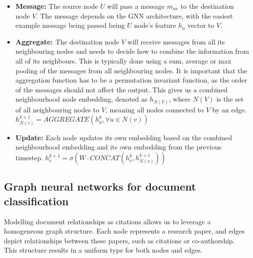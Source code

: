 \documentclass[10pt,oneside]{book}
\begin{document}
\begin{tcolorbox}[title=Message Passing Neural Networks in GNNs]
    \begin{itemize}
        \item {\bf{Message:}} The source node $U$ will pass a message $m_{uv}$ to the destination node $V$. The message depends on the GNN architecture, with the easiest example message being passed being $U$ node's feature $h_u$ vector to $V$.
        \item {\bf{Aggregate: }} The destination node $V$ will receive messages from all its neighbouring nodes and needs to decide how to combine the information from all of its neighbours. This is typically done using a sum, average or max pooling of the messages from all neighbouring nodes. It is important that the aggregation function has to be a permutation invariant function, as the order of the messages should not affect the output. This gives us a combined neighbourhood node embedding, denoted as $h_{N(V)}$, where $N(V)$ is the set of all neighbouring nodes to $V$, meaning all nodes connected to $V$ by an edge. $h_{N(v)}^{k+1} = AGGREGATE({h_u^k, \forall u \in N(v)})$
        \item {\bf{Update: }} Each node updates its own embedding based on the combined neighbourhood embedding and its own embedding from the previous timestep. $h_v^{k+1} = \sigma(W \cdot CONCAT(h_v^k, h_{N(v)}^{k+1}))$
    \end{itemize}

\end{tcolorbox}

\subsection{Graph neural networks for document classification}

Modelling document relationships as citations allows us to leverage a homogeneous graph structure. Each node represents a research paper, and edges depict relationships between these papers, such as citations or co-authorship. This structure results in a uniform type for both nodes and edges.
\end{document}
